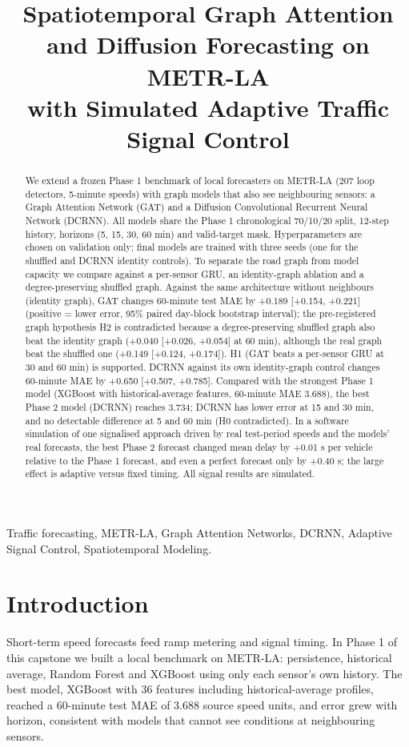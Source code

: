 \documentclass[conference]{IEEEtran}
\title{Spatiotemporal Graph Attention and Diffusion Forecasting on METR-LA\\with Simulated Adaptive Traffic Signal Control}
\author{\IEEEauthorblockN{Pankaj Baid, Ashutosh Singh, Shreya Suman\\Narendra Singh, Ranvendra Pratap Singh}}
\begin{document}
\maketitle
\begin{abstract}
We extend a frozen Phase 1 benchmark of local forecasters on METR-LA (207 loop detectors, 5-minute speeds) with graph models that also see neighbouring sensors: a Graph Attention Network (GAT) and a Diffusion Convolutional Recurrent Neural Network (DCRNN). All models share the Phase 1 chronological 70/10/20 split, 12-step history, horizons (5, 15, 30, 60 min) and valid-target mask. Hyperparameters are chosen on validation only; final models are trained with three seeds (one for the shuffled and DCRNN identity controls). To separate the road graph from model capacity we compare against a per-sensor GRU, an identity-graph ablation and a degree-preserving shuffled graph. Against the same architecture without neighbours (identity graph), GAT changes 60-minute test MAE by +0.189 [+0.154, +0.221] (positive = lower error, 95\% paired day-block bootstrap interval); the pre-registered graph hypothesis H2 is contradicted because a degree-preserving shuffled graph also beat the identity graph (+0.040 [+0.026, +0.054] at 60 min), although the real graph beat the shuffled one (+0.149 [+0.124, +0.174]). H1 (GAT beats a per-sensor GRU at 30 and 60 min) is supported. DCRNN against its own identity-graph control changes 60-minute MAE by +0.650 [+0.507, +0.785]. Compared with the strongest Phase 1 model (XGBoost with historical-average features, 60-minute MAE 3.688), the best Phase 2 model (DCRNN) reaches 3.734; DCRNN has lower error at 15 and 30 min, and no detectable difference at 5 and 60 min (H0 contradicted). In a software simulation of one signalised approach driven by real test-period speeds and the models' real forecasts, the best Phase 2 forecast changed mean delay by +0.01 s per vehicle relative to the Phase 1 forecast, and even a perfect forecast only by +0.40 s; the large effect is adaptive versus fixed timing. All signal results are simulated.
\end{abstract}
\begin{IEEEkeywords}Traffic forecasting, METR-LA, Graph Attention Networks, DCRNN, Adaptive Signal Control, Spatiotemporal Modeling.\end{IEEEkeywords}
\section{Introduction}
Short-term speed forecasts feed ramp metering and signal timing. In Phase 1 of this capstone we built a local benchmark on METR-LA: persistence, historical average, Random Forest and XGBoost using only each sensor's own history. The best model, XGBoost with 36 features including historical-average profiles, reached a 60-minute test MAE of 3.688 source speed units, and error grew with horizon, consistent with models that cannot see conditions at neighbouring sensors.
\end{document}
